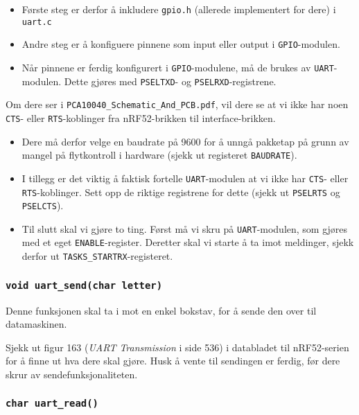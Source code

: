 \begin{itemize}
    \item Første steg er derfor å inkludere \verb|gpio.h| (allerede implementert for dere) i \verb|uart.c|
    \item Andre steg er å konfiguere pinnene som input eller output i \verb|GPIO|-modulen.
    \item Når pinnene er ferdig konfigurert i \verb|GPIO|-modulene, må de brukes av \verb|UART|-modulen. Dette gjøres med \verb|PSELTXD|- og \verb|PSELRXD|-registrene.
\end{itemize}



Om dere ser i \verb|PCA10040_Schematic_And_PCB.pdf|, vil dere se at vi ikke har noen \verb|CTS|- eller \verb|RTS|-koblinger fra nRF52-brikken til interface-brikken. 

\begin{itemize}
    \item Dere må derfor velge en baudrate på 9600 for å unngå pakketap på grunn av mangel på flytkontroll i hardware (sjekk ut registeret \verb|BAUDRATE|).
    \item I tillegg er det viktig å faktisk fortelle \verb|UART|-modulen at vi ikke har \verb|CTS|- eller \verb|RTS|-koblinger. Sett opp de riktige registrene for dette (sjekk ut \verb|PSELRTS| og \verb|PSELCTS|).
    \item 

Til slutt skal vi gjøre to ting. Først må vi skru på \verb|UART|-modulen, som gjøres med et eget \verb|ENABLE|-register. Deretter skal vi starte å ta imot meldinger, sjekk derfor ut \verb|TASKS_STARTRX|-registeret. 
\end{itemize}







\cprotect\subsubsection{\lstinline{void uart_send(char letter)}}

Denne funksjonen skal ta i mot en enkel bokstav, for å sende den over til datamaskinen.

Sjekk ut figur 163 (\textit{UART Transmission} i side 536) i databladet til nRF52-serien for å finne ut hva dere skal gjøre. Husk å vente til sendingen er ferdig, før dere skrur av sendefunksjonaliteten.


\cprotect\subsubsection{\lstinline{char uart_read()}}

